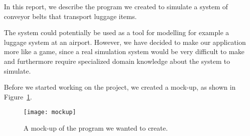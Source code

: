 In this report, we describe the program we created to simulate a system of conveyor belts that transport luggage items.

The system could potentially be used as a tool for modelling for example a luggage system at an airport. However, we have decided to make our application more like a game, since a real simulation system would be very difficult to make and furthermore require specialized domain knowledge about the system to simulate.

Before we started working on the project, we created a mock-up, as shown in Figure~\ref{fig:mockup}.

\begin{figure}
  \begin{center}
    \texttt{[image: mockup]}
    \caption{A mock-up of the program we wanted to create.}
    \label{fig:mockup}
  \end{center}
\end{figure}
